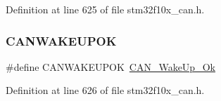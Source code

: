 Definition at line 625 of file stm32f10x\+\_\+can.\+h.

\mbox{\label{group___c_a_n___legacy_gafed6ab4dbb00c9d63f6a7cdf323f33ef}} 
\subsubsection{\texorpdfstring{C\+A\+N\+W\+A\+K\+E\+U\+P\+OK}{CANWAKEUPOK}}
{\footnotesize\ttfamily \#define C\+A\+N\+W\+A\+K\+E\+U\+P\+OK~\hyperlink{group___c_a_n__wake__up__constants_ga152e4935cf85bdfb803eb36b656cd690}{C\+A\+N\+\_\+\+Wake\+Up\+\_\+\+Ok}}



Definition at line 626 of file stm32f10x\+\_\+can.\+h.

